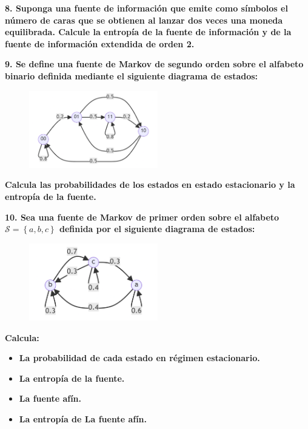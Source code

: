 \documentclass{article}
\begin{document}
\pagebreak

\textbf{
8. Suponga una fuente de información que emite como símbolos el número de caras que se obtienen al lanzar dos veces una moneda equilibrada. Calcule la entropía de la fuente de información y de la fuente de información extendida de orden 2.
}

\vspace{1cm}

\textbf{
9. Se define una fuente de Markov de segundo orden sobre el alfabeto binario definida mediante el siguiente diagrama de estados:
}

\begin{figure}[htbp!]
    \centering
    \includegraphics[width=0.5\textwidth]{./img/mermaid1.png}
\end{figure}

\textbf{
Calcula las probabilidades de los estados en estado estacionario y la entropía de la fuente.
}

\vspace{1cm}

\textbf{
10. Sea una fuente de Markov de primer orden sobre el alfabeto $\mathcal{S}=\left\{a,b,c\right\}$ definida por el siguiente diagrama de estados:
}

\begin{figure}[htbp!]
    \centering
    \includegraphics[width=0.5\textwidth]{./img/mermaid2.png}
\end{figure}

\textbf{Calcula:}

\begin{itemize}
    \item\textbf{La probabilidad de cada estado en régimen estacionario.}
    \item\textbf{La entropía de la fuente.}
    \item\textbf{La fuente afín.}
    \item\textbf{La entropía de La fuente afín.}
\end{itemize}
\end{document}

